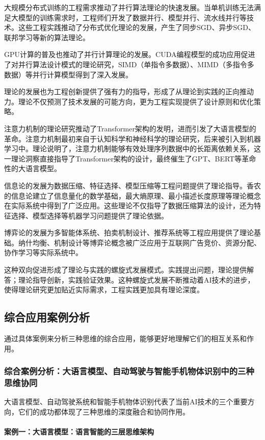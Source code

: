 大规模分布式训练的工程需求推动了并行算法理论的快速发展。当单机训练无法满足大模型的训练需求时，工程师们开发了数据并行、模型并行、流水线并行等技术。这些工程实践推动了分布式优化理论的发展，产生了同步SGD、异步SGD、联邦学习等新的算法理论。

GPU计算的普及也推动了并行计算理论的发展。CUDA编程模型的成功应用促进了对并行算法设计模式的理论研究，SIMD（单指令多数据）、MIMD（多指令多数据）等并行计算模型得到了深入发展。

理论的发展也为工程创新提供了强有力的指导，形成了从理论到实践的正向推动力。理论不仅预测了技术发展的可能方向，更为工程实现提供了设计原则和优化策略。

注意力机制的理论研究推动了Transformer架构的发明，进而引发了大语言模型的革命。注意力机制最初来自于认知科学和神经科学的理论研究，后来被引入到机器学习中。理论说明了，注意力机制能够有效处理序列数据中的长距离依赖关系，这一理论洞察直接指导了Transformer架构的设计，最终催生了GPT、BERT等革命性的大语言模型。

信息论的发展为数据压缩、特征选择、模型压缩等工程问题提供了理论指导。香农的信息论建立了信息量化的数学基础，最大熵原理、最小描述长度原理等理论概念在实际系统中得到了广泛应用。这些理论不仅指导了数据压缩算法的设计，还为特征选择、模型选择等机器学习问题提供了理论依据。

博弈论的发展为多智能体系统、拍卖机制设计、推荐系统等工程应用提供了理论基础。纳什均衡、机制设计等博弈论概念被广泛应用于互联网广告竞价、资源分配、协作学习等实际系统中。

这种双向促进形成了理论与实践的螺旋式发展模式。实践提出问题，理论提供解答；理论指导创新，实践验证效果。这种螺旋式发展不断推动着AI技术的进步，使得理论研究更加贴近实际需求，工程实践更加具有理论深度。

\subsection{综合应用案例分析}

通过具体案例来分析三种思维的综合应用，能够更好地理解它们的相互关系和作用。

\subsubsection{综合案例分析：大语言模型、自动驾驶与智能手机物体识别中的三种思维协同}

大语言模型、自动驾驶系统和智能手机物体识别代表了当前AI技术的三个重要方向，它们的成功都体现了三种思维的深度融合和协同作用。

\paragraph{案例一：大语言模型：语言智能的三层思维架构}

